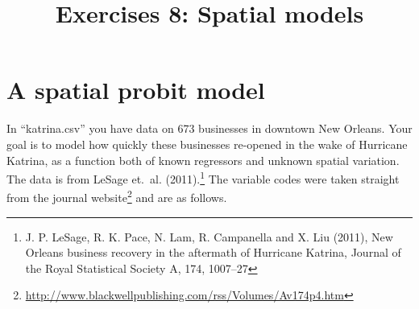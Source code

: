 \documentclass{mynotes}
\title[Exercises 8 $\cdot$ SSC 383D]{Exercises 8: Spatial models}
\date{}  %
\begin{document}
\maketitle%

\section{A spatial probit model}

In ``katrina.csv'' you have data on 673 businesses in downtown New Orleans.  Your goal is to model how quickly these businesses re-opened in the wake of Hurricane Katrina, as a function both of known regressors and unknown spatial variation.  The data is from LeSage et.~al. (2011).\footnote{J. P. LeSage, R. K. Pace, N. Lam, R. Campanella and X. Liu (2011), New Orleans business recovery in the aftermath of Hurricane Katrina, Journal of the Royal Statistical Society A, 174, 1007--27}  The variable codes were taken straight from the journal website\footnote{\url{http://www.blackwellpublishing.com/rss/Volumes/Av174p4.htm}} and are as follows.

\vspace{\baselineskip}
\end{document}
